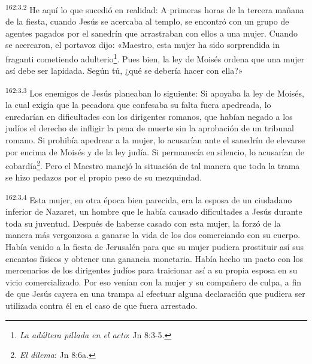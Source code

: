 \par 
\textsuperscript{162:3.2} He aquí lo que sucedió en realidad: A primeras horas de la tercera mañana de la fiesta, cuando Jesús se acercaba al templo, se encontró con un grupo de agentes pagados por el sanedrín que arrastraban con ellos a una mujer. Cuando se acercaron, el portavoz dijo: «Maestro, esta mujer ha sido sorprendida in fraganti cometiendo adulterio\footnote{\textit{La adúltera pillada en el acto}: Jn 8:3-5.}. Pues bien, la ley de Moisés ordena que una mujer así debe ser lapidada. Según tú, ¿qué se debería hacer con ella?»

\par 
\textsuperscript{162:3.3} Los enemigos de Jesús planeaban lo siguiente: Si apoyaba la ley de Moisés, la cual exigía que la pecadora que confesaba su falta fuera apedreada, lo enredarían en dificultades con los dirigentes romanos, que habían negado a los judíos el derecho de infligir la pena de muerte sin la aprobación de un tribunal romano. Si prohibía apedrear a la mujer, lo acusarían ante el sanedrín de elevarse por encima de Moisés y de la ley judía. Si permanecía en silencio, lo acusarían de cobardía\footnote{\textit{El dilema}: Jn 8:6a.}. Pero el Maestro manejó la situación de tal manera que toda la trama se hizo pedazos por el propio peso de su mezquindad.

\par 
\textsuperscript{162:3.4} Esta mujer, en otra época bien parecida, era la esposa de un ciudadano inferior de Nazaret, un hombre que le había causado dificultades a Jesús durante toda su juventud. Después de haberse casado con esta mujer, la forzó de la manera más vergonzosa a ganarse la vida de los dos comerciando con su cuerpo. Había venido a la fiesta de Jerusalén para que su mujer pudiera prostituir así sus encantos físicos y obtener una ganancia monetaria. Había hecho un pacto con los mercenarios de los dirigentes judíos para traicionar así a su propia esposa en su vicio comercializado. Por eso venían con la mujer y su compañero de culpa, a fin de que Jesús cayera en una trampa al efectuar alguna declaración que pudiera ser utilizada contra él en el caso de que fuera arrestado.

